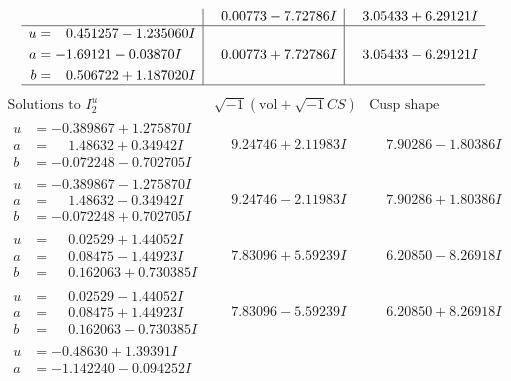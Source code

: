 \documentclass[1p]{elsarticle_modified}
\theoremstyle{definition}
\newcommand{\I}{\sqrt{-1}}
\begin{document}
$$\begin{array}{c|c|c}
 & \phantom{-}0.00773 - 7.72786 I & \phantom{-}3.05433 + 6.29121 I \\ \hline\begin{aligned}
u &= \phantom{-}0.451257 - 1.235060 I \\
a &= -1.69121 - 0.03870 I \\
b &= \phantom{-}0.506722 + 1.187020 I\end{aligned}
 & \phantom{-}0.00773 + 7.72786 I & \phantom{-}3.05433 - 6.29121 I\\
 \hline 
 \end{array}$$\newpage$$\begin{array}{c|c|c}  
\text{Solutions to }I^u_{2}& \I (\text{vol} + \sqrt{-1}CS) & \text{Cusp shape}\\
 \hline 
\begin{aligned}
u &= -0.389867 + 1.275870 I \\
a &= \phantom{-}1.48632 + 0.34942 I \\
b &= -0.072248 - 0.702705 I\end{aligned}
 & \phantom{-}9.24746 + 2.11983 I & \phantom{-}7.90286 - 1.80386 I \\ \hline\begin{aligned}
u &= -0.389867 - 1.275870 I \\
a &= \phantom{-}1.48632 - 0.34942 I \\
b &= -0.072248 + 0.702705 I\end{aligned}
 & \phantom{-}9.24746 - 2.11983 I & \phantom{-}7.90286 + 1.80386 I \\ \hline\begin{aligned}
u &= \phantom{-}0.02529 + 1.44052 I \\
a &= \phantom{-}0.08475 - 1.44923 I \\
b &= \phantom{-}0.162063 + 0.730385 I\end{aligned}
 & \phantom{-}7.83096 + 5.59239 I & \phantom{-}6.20850 - 8.26918 I \\ \hline\begin{aligned}
u &= \phantom{-}0.02529 - 1.44052 I \\
a &= \phantom{-}0.08475 + 1.44923 I \\
b &= \phantom{-}0.162063 - 0.730385 I\end{aligned}
 & \phantom{-}7.83096 - 5.59239 I & \phantom{-}6.20850 + 8.26918 I \\ \hline\begin{aligned}
u &= -0.48630 + 1.39391 I \\
a &= -1.142240 - 0.094252 I \\

\end{aligned}
\end{array}$$
\end{document}
